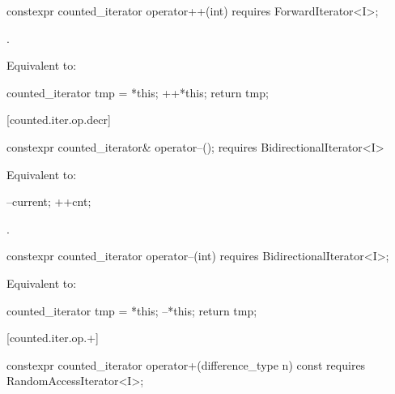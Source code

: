 \begin{addedblock}
\begin{itemdecl}
constexpr counted_iterator operator++(int)
  requires ForwardIterator<I>;
\end{itemdecl}

\begin{itemdescr}
\pnum
\expects {}.

\pnum
\effects Equivalent to:
\begin{codeblock}
counted_iterator tmp = *this;
++*this;
return tmp;
\end{codeblock}
\end{itemdescr}

[counted.iter.op.decr]{}

%
%
\begin{itemdecl}
  constexpr counted_iterator& operator--();
    requires BidirectionalIterator<I>
\end{itemdecl}

\begin{itemdescr}
\pnum
\effects Equivalent to:
\begin{codeblock}
--current;
++cnt;
\end{codeblock}

\pnum
\returns {}.
\end{itemdescr}

%
%
\begin{itemdecl}
  constexpr counted_iterator operator--(int)
    requires BidirectionalIterator<I>;
\end{itemdecl}

\begin{itemdescr}
\pnum
\effects Equivalent to:
\begin{codeblock}
counted_iterator tmp = *this;
--*this;
return tmp;
\end{codeblock}
\end{itemdescr}

[counted.iter.op.+]{}

%
%
\begin{itemdecl}
  constexpr counted_iterator operator+(difference_type n) const
    requires RandomAccessIterator<I>;
\end{itemdecl}


\end{addedblock}
